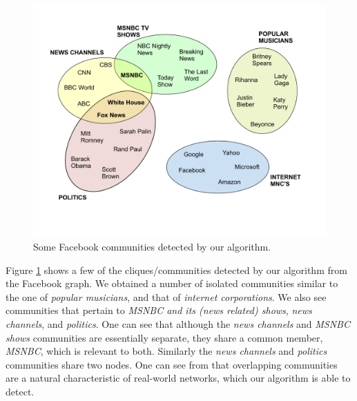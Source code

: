 %


\begin{figure}%
  \centering
    \includegraphics[scale=0.5]{communities_fb.pdf}
    
  \caption{Some Facebook communities detected by our algorithm.}
\label{fig-communities-fb}
\end{figure}

Figure \ref{fig-communities-fb} shows a few of the cliques/communities detected by our algorithm from the Facebook graph. We obtained a number of isolated communities similar to the one of {\it popular musicians}, and that of {\it internet corporations}. We also see communities that pertain to {\it MSNBC and its (news related) shows}, {\it news channels}, and {\it politics}. One can see that although the {\it news channels} and {\it MSNBC shows} communities are essentially separate, they share a common member, {\it MSNBC}, which is relevant to both. Similarly the {\it news channels} and {\it politics} communities share two nodes. One can see from that overlapping communities are a natural characteristic of real-world networks, which our algorithm is able to detect.


